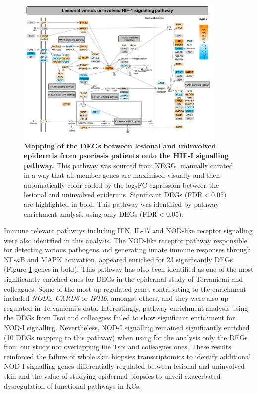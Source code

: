 \begin{figure}[htbp]
\centering
\includegraphics[width=0.9\textwidth]{./Results2/pdfs/PS_lesional_uninvolved_all_HIF_1_pathway}
\caption[Mapping of the DEGs between lesional and uninvolved epidermis from psoriasis patients onto the HIF-I signalling pathway.]{\textbf{Mapping of the DEGs between lesional and uninvolved epidermis from psoriasis patients onto the HIF-I signalling pathway.} This pathway was sourced from KEGG, manually curated in a way that all member genes are maximised visually and then automatically color-coded by the log$_2$FC expression between the lesional and uninvolved epidermis. Significant DEGs (FDR$<$0.05) are highlighted in bold. This pathway was identified by pathway enrichment analysis using only DEGs (FDR$<$0.05).}
\label{figure:PS_lesional_vs_uninvolved_HIF_pathway}
\end{figure}

Immune relevant pathways including IFN, IL-17 and NOD-like receptor signalling were also identified in this analysis. The NOD-like receptor pathway responsible for detecting various pathogens and generating innate immune responses through NF-$\kappa$B and MAPK activation, appeared enriched for 23 significantly DEGs (Figure \ref{figure:PS_lesional_vs_uninvolved_HIF_pathway} genes in bold). This pathway has also been identified as one of the most significantly enriched ones for DEGs in the epidermal study of Tervaniemi and colleagues. Some of the most up-regulated genes contributing to the enrichment included \textit{NOD2}, \textit{CARD6} or \textit{IFI16}, amongst others, and they were also up-regulated in Tervaniemi's data. Interestingly, pathway enrichment analysis using the DEGs from Tsoi and colleagues failed to show significant enrichment for NOD-I signalling. Nevertheless, NOD-I signalling remained significantly enriched (10 DEGs mapping to this pathway) when using for the analysis only the DEGs from our study not overlapping the Tsoi and colleagues ones. These results reinforced the failure of whole skin biopsies transcriptomics to identify additional NOD-I signalling genes differentially regulated between lesional and uninvolved skin and the value of studying epidermal biopsies to unveil exacerbated dysregulation of functional pathways in KCs.


